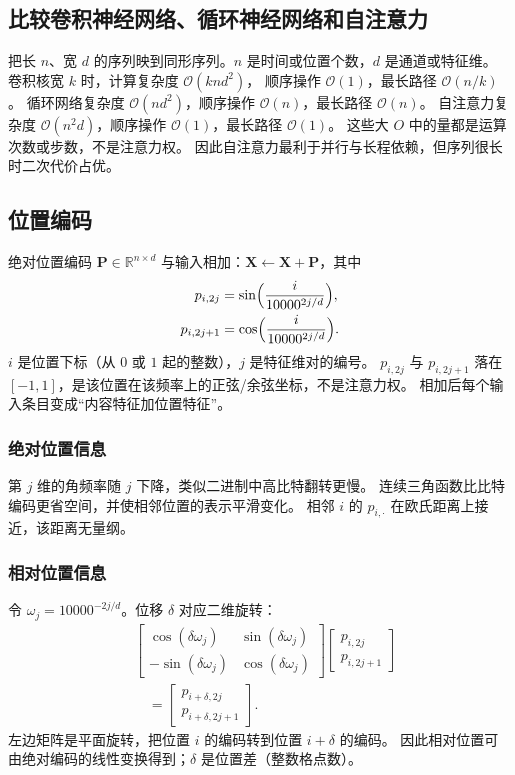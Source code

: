 \subsection{比较卷积神经网络、循环神经网络和自注意力}

把长 $n$、宽 $d$ 的序列映到同形序列。$n$ 是时间或位置个数，$d$ 是通道或特征维。
卷积核宽 $k$ 时，计算复杂度 $\mathcal{O}(knd^{2})$，
顺序操作 $\mathcal{O}(1)$，最长路径 $\mathcal{O}(n/k)$。
循环网络复杂度 $\mathcal{O}(nd^{2})$，顺序操作 $\mathcal{O}(n)$，最长路径 $\mathcal{O}(n)$。
自注意力复杂度 $\mathcal{O}(n^{2}d)$，顺序操作 $\mathcal{O}(1)$，最长路径 $\mathcal{O}(1)$。
这些大 $O$ 中的量都是运算次数或步数，不是注意力权。
因此自注意力最利于并行与长程依赖，但序列很长时二次代价占优。

\subsection{位置编码}

绝对位置编码 $\bm{P}\in\mathbb{R}^{n\times d}$ 与输入相加：$\bm{X}\leftarrow\bm{X}+\bm{P}$，其中
\begin{align*}
p_{i,2j}
&=
\sin\Bigl(\frac{i}{10000^{2j/d}}\Bigr),
\\
p_{i,2j+1}
&=
\cos\Bigl(\frac{i}{10000^{2j/d}}\Bigr).
\end{align*}
$i$ 是位置下标（从 $0$ 或 $1$ 起的整数），$j$ 是特征维对的编号。
$p_{i,2j}$ 与 $p_{i,2j+1}$ 落在 $[-1,1]$，是该位置在该频率上的正弦/余弦坐标，不是注意力权。
相加后每个输入条目变成“内容特征加位置特征”。

\subsubsection{绝对位置信息}

第 $j$ 维的角频率随 $j$ 下降，类似二进制中高比特翻转更慢。
连续三角函数比比特编码更省空间，并使相邻位置的表示平滑变化。
相邻 $i$ 的 $p_{i,\cdot}$ 在欧氏距离上接近，该距离无量纲。

\subsubsection{相对位置信息}

令 $\omega_j=10000^{-2j/d}$。位移 $\delta$ 对应二维旋转：
\begin{align*}
&
\begin{bmatrix}
\cos(\delta\omega_j)&\sin(\delta\omega_j)\\
-\sin(\delta\omega_j)&\cos(\delta\omega_j)
\end{bmatrix}
\begin{bmatrix}
p_{i,2j}\\
p_{i,2j+1}
\end{bmatrix}
\\
&\quad=
\begin{bmatrix}
p_{i+\delta,2j}\\
p_{i+\delta,2j+1}
\end{bmatrix}.
\end{align*}
左边矩阵是平面旋转，把位置 $i$ 的编码转到位置 $i+\delta$ 的编码。
因此相对位置可由绝对编码的线性变换得到；$\delta$ 是位置差（整数格点数）。

